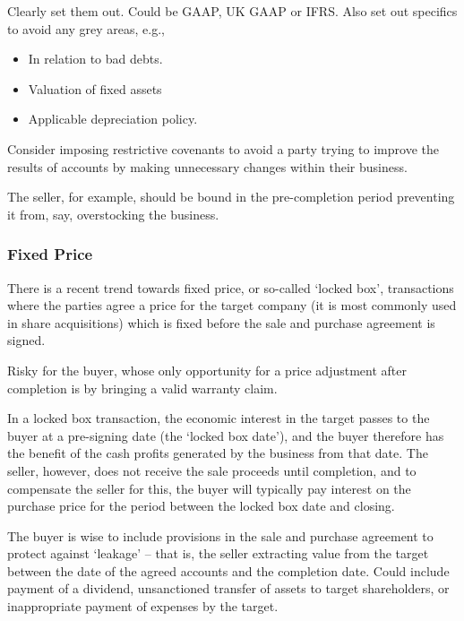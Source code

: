 \documentclass[
]{article}
\newenvironment{Shaded}{}{}
\newcommand{\NormalTok}[1]{#1}
\providecommand{\tightlist}{%
  \setlength{\itemsep}{0pt}\setlength{\parskip}{0pt}}
\begin{document}
Clearly set them out. Could be GAAP, UK GAAP or IFRS. Also set out
specifics to avoid any grey areas, e.g.,

\begin{itemize}
\tightlist
\item
  In relation to bad debts.
\item
  Valuation of fixed assets
\item
  Applicable depreciation policy.
\end{itemize}

Consider imposing restrictive covenants to avoid a party trying to
improve the results of accounts by making unnecessary changes within
their business.

The seller, for example, should be bound in the pre-completion period
preventing it from, say, overstocking the business.

\hypertarget{fixed-price}{%
\subsubsection{Fixed Price}\label{fixed-price}}

There is a recent trend towards fixed price, or so-called `locked box',
transactions where the parties agree a price for the target company (it
is most commonly used in share acquisitions) which is fixed before the
sale and purchase agreement is signed.

Risky for the buyer, whose only opportunity for a price adjustment after
completion is by bringing a valid warranty claim.

\begin{Shaded}
\begin{Highlighting}[]
\NormalTok{In a locked box transaction, the economic interest in the target passes to the buyer at a pre{-}signing date (the ‘locked box date’), and the buyer therefore has the benefit of the cash profits generated by the business from that date. The seller, however, does not receive the sale proceeds until completion, and to compensate the seller for this, the buyer will typically pay interest on the purchase price for the period between the locked box date and closing.}
\end{Highlighting}
\end{Shaded}

The buyer is wise to include provisions in the sale and purchase
agreement to protect against `leakage' -- that is, the seller extracting
value from the target between the date of the agreed accounts and the
completion date. Could include payment of a dividend, unsanctioned
transfer of assets to target shareholders, or inappropriate payment of
expenses by the target.
\end{document}
